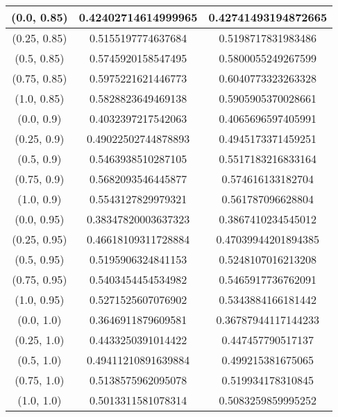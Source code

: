 \begin{table}[H]
\begin{tabular}{|c|c|c|}
\hline
(0.0, 0.85) & 0.42402714614999965 & 0.42741493194872665 \\
\hline
(0.25, 0.85) & 0.5155197774637684 & 0.5198717831983486 \\
\hline
(0.5, 0.85) & 0.5745920158547495 & 0.5800055249267599 \\
\hline
(0.75, 0.85) & 0.5975221621446773 & 0.6040773323263328 \\
\hline
(1.0, 0.85) & 0.5828823649469138 & 0.5905905370028661 \\
\hline
\hline
(0.0, 0.9) & 0.4032397217542063 & 0.4065696597405991 \\
\hline
(0.25, 0.9) & 0.49022502744878893 & 0.4945173371459251 \\
\hline
(0.5, 0.9) & 0.5463938510287105 & 0.5517183216833164 \\
\hline
(0.75, 0.9) & 0.5682093546445877 & 0.574616133182704 \\
\hline
(1.0, 0.9) & 0.5543127829979321 & 0.561787096628804 \\
\hline
\hline
(0.0, 0.95) & 0.38347820003637323 & 0.3867410234545012 \\
\hline
(0.25, 0.95) & 0.46618109311728884 & 0.47039944201894385 \\
\hline
(0.5, 0.95) & 0.5195906324841153 & 0.5248107016213208 \\
\hline
(0.75, 0.95) & 0.5403454454534982 & 0.5465917736762091 \\
\hline
(1.0, 0.95) & 0.5271525607076902 & 0.5343884166181442 \\
\hline
\hline
(0.0, 1.0) & 0.3646911879609581 & 0.36787944117144233 \\
\hline
(0.25, 1.0) & 0.4433250391014422 & 0.447457790517137 \\
\hline
(0.5, 1.0) & 0.49411210891639884 & 0.499215381675065 \\
\hline
(0.75, 1.0) & 0.5138575962095078 & 0.519934178310845 \\
\hline
(1.0, 1.0) & 0.5013311581078314 & 0.5083259859995252 \\
\hline
\end{tabular}
\end{table}
\normalsize

